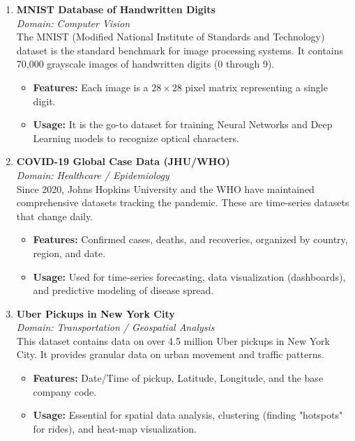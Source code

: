\documentclass[a4paper,12pt]{article}
\begin{document}
\begin{enumerate}
    \item \textbf{MNIST Database of Handwritten Digits} \\
    \textit{Domain: Computer Vision} \\
    The MNIST (Modified National Institute of Standards and Technology) dataset is the standard benchmark for image processing systems. It contains 70,000 grayscale images of handwritten digits (0 through 9).
    \begin{itemize}
        \item \textbf{Features:} Each image is a $28 \times 28$ pixel matrix representing a single digit.
        \item \textbf{Usage:} It is the go-to dataset for training Neural Networks and Deep Learning models to recognize optical characters.
    \end{itemize}

    \item \textbf{COVID-19 Global Case Data (JHU/WHO)} \\
    \textit{Domain: Healthcare / Epidemiology} \\
    Since 2020, Johns Hopkins University and the WHO have maintained comprehensive datasets tracking the pandemic. These are time-series datasets that change daily.
    \begin{itemize}
        \item \textbf{Features:} Confirmed cases, deaths, and recoveries, organized by country, region, and date.
        \item \textbf{Usage:} Used for time-series forecasting, data visualization (dashboards), and predictive modeling of disease spread.
    \end{itemize}

    \item \textbf{Uber Pickups in New York City} \\
    \textit{Domain: Transportation / Geospatial Analysis} \\
    This dataset contains data on over 4.5 million Uber pickups in New York City. It provides granular data on urban movement and traffic patterns.
    \begin{itemize}
        \item \textbf{Features:} Date/Time of pickup, Latitude, Longitude, and the base company code.
        \item \textbf{Usage:} Essential for spatial data analysis, clustering (finding "hotspots" for rides), and heat-map visualization.
    \end{itemize}
\end{enumerate}
\end{document}
